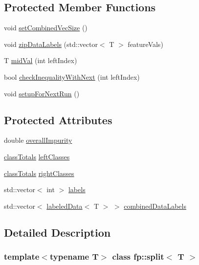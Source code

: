 \subsection*{Protected Member Functions}
\begin{DoxyCompactItemize}
\item 
void \hyperlink{classfp_1_1split_a9c1560ae01a536ed0245d667ee7d5fb6}{set\+Combined\+Vec\+Size} ()
\item 
void \hyperlink{classfp_1_1split_a7b34c093da10d549e3750c641dfa991d}{zip\+Data\+Labels} (std\+::vector$<$ T $>$ feature\+Vals)
\item 
T \hyperlink{classfp_1_1split_a0a8bc35b7ff78cb96332cdbda12b5fe5}{mid\+Val} (int left\+Index)
\item 
bool \hyperlink{classfp_1_1split_ac75c6034210f3c53ff3435e2d12377e1}{check\+Inequality\+With\+Next} (int left\+Index)
\item 
void \hyperlink{classfp_1_1split_a5ccfceb36e8ea567816af95bb4ae4fea}{setup\+For\+Next\+Run} ()
\end{DoxyCompactItemize}
\subsection*{Protected Attributes}
\begin{DoxyCompactItemize}
\item 
double \hyperlink{classfp_1_1split_a1eba74d8afed2852da3eb004afe76bb7}{overall\+Impurity}
\item 
\hyperlink{classfp_1_1classTotals}{class\+Totals} \hyperlink{classfp_1_1split_a3be6dcf32281715e6376e9f5f8da18f0}{left\+Classes}
\item 
\hyperlink{classfp_1_1classTotals}{class\+Totals} \hyperlink{classfp_1_1split_af5366297f7de9b8ff0911186300bab7e}{right\+Classes}
\item 
std\+::vector$<$ int $>$ \hyperlink{classfp_1_1split_a9658b163c2cd30e9900e21c3b1c3f2f9}{labels}
\item 
std\+::vector$<$ \hyperlink{classfp_1_1labeledData}{labeled\+Data}$<$ T $>$ $>$ \hyperlink{classfp_1_1split_ac8f54cf4a42335814e10e351c49e3c32}{combined\+Data\+Labels}
\end{DoxyCompactItemize}


\subsection{Detailed Description}
\subsubsection*{template$<$typename T$>$\newline
class fp\+::split$<$ T $>$}



